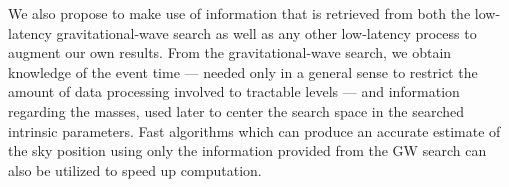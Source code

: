 We also propose to make use of information that is retrieved from both the low-latency gravitational-wave search as well as any other low-latency process to augment our own results. From the gravitational-wave search, we obtain knowledge of the event time --- needed only in a general sense to restrict the amount of data processing involved to tractable levels --- and information regarding the masses, used later to center the search space in the searched intrinsic parameters. Fast algorithms which can produce an accurate estimate of the sky position using only the information provided from the GW search\cite{gw-astro-Bayestar} can also be utilized to speed up computation.



